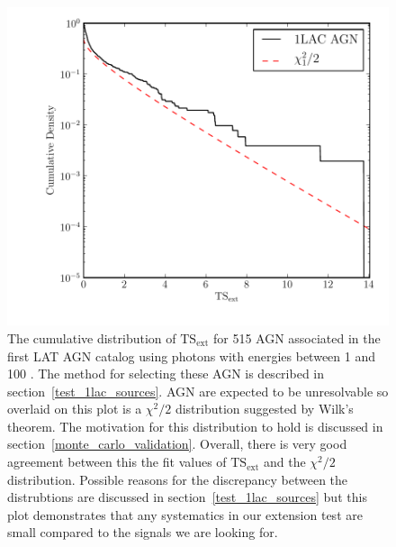 \documentclass[12pt,preprint]{aastex}
\newcommand{\gev}{\text{GeV}\xspace}
\newcommand{\tsext}{{\ensuremath{\text{TS}_\text{ext}}}\xspace}
\begin{document}
\clearpage
\begin{figure}
  \begin{center}
    \includegraphics{source_plots/agn.pdf}
    \end{center}
    \caption{The cumulative distribution of \tsext for 515 AGN associated
    in the first LAT AGN catalog using photons with energies between 1
    \gev and 100 \gev.  The method for selecting these AGN is described in
    section~\ref{test_1lac_sources}.  AGN are expected to be unresolvable
    so overlaid on this plot is a $\chi^2/2$ distribution suggested by
    Wilk's theorem.  The motivation for this distribution to hold is
    discussed in section~\ref{monte_carlo_validation}.  Overall, there
    is very good agreement between this the fit values of \tsext and the
    $\chi^2/2$ distribution.  Possible reasons for the discrepancy between
    the distrubtions are discussed in section~\ref{test_1lac_sources}
    but this plot demonstrates that any systematics in our extension
    test are small compared to the signals we are looking for.
    }\label{agn_ts_ext}
  \end{figure}


\end{document}
